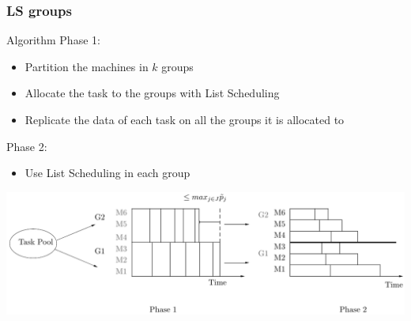 \documentclass[usenames,dvipsnames]{beamer}
\begin{document}
\begin{frame}
  \frametitle{LS groups}

  \begin{block}{Algorithm}
    Phase 1:
    \begin{itemize}
    \item Partition the machines in $k$ groups
    \item Allocate the task to the groups with List Scheduling
    \item Replicate the data of each task on all the groups it is allocated to
    \end{itemize}
    
    Phase 2:
    \begin{itemize}
    \item Use List Scheduling in each group
    \end{itemize}    
  \end{block}
  
  \includegraphics[width=\textwidth]{figs/model3.pdf}
\end{frame}
\end{document}
